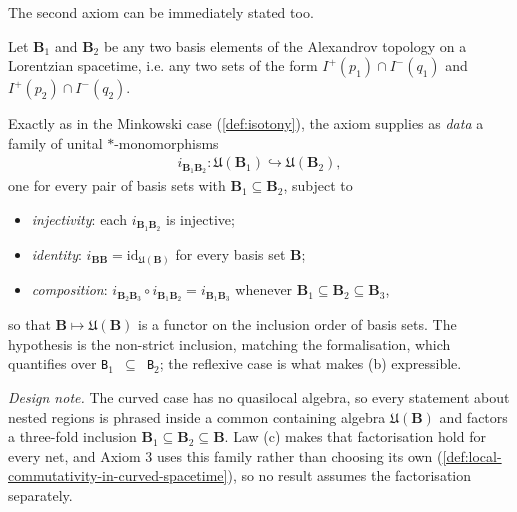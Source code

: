 The second axiom can be immediately stated too.

\begin{definition}
    \label{def:isotony-in-curved-spacetime}
    \leanok
    Let $\mathbf{B}_1$ and $\mathbf{B}_2$ be any two basis elements of the Alexandrov topology on a Lorentzian spacetime, i.e. any two sets of the form $I^+(p_1) \cap I^-(q_1)$ and $I^+(p_2) \cap I^-(q_2)$.
    
    Exactly as in the Minkowski case (\ref{def:isotony}), the axiom supplies as \emph{data} a family of unital $*$-monomorphisms
    \begin{align}
        i_{\mathbf{B}_1\mathbf{B}_2} : \mathfrak{U}(\mathbf{B}_1) \hookrightarrow \mathfrak{U}(\mathbf{B}_2),
    \end{align}
    one for every pair of basis sets with $\mathbf{B}_1 \subseteq \mathbf{B}_2$, subject to
    \begin{itemize}
        \item[(a)] \emph{injectivity}: each $i_{\mathbf{B}_1\mathbf{B}_2}$ is injective;
        \item[(b)] \emph{identity}: $i_{\mathbf{B}\mathbf{B}} = \mathrm{id}_{\mathfrak{U}(\mathbf{B})}$ for every basis set $\mathbf{B}$;
        \item[(c)] \emph{composition}: $i_{\mathbf{B}_2\mathbf{B}_3} \circ i_{\mathbf{B}_1\mathbf{B}_2} = i_{\mathbf{B}_1\mathbf{B}_3}$ whenever $\mathbf{B}_1 \subseteq \mathbf{B}_2 \subseteq \mathbf{B}_3$,
    \end{itemize}
    so that $\mathbf{B} \mapsto \mathfrak{U}(\mathbf{B})$ is a functor on the inclusion order of basis sets. The hypothesis is the non-strict inclusion, matching the formalisation, which quantifies over \texttt{B\ensuremath{_1} \ensuremath{\subseteq} B\ensuremath{_2}}; the reflexive case is what makes (b) expressible.

    \emph{Design note.} The curved case has no quasilocal algebra, so every statement about nested regions is phrased inside a common containing algebra $\mathfrak{U}(\mathbf{B})$ and factors a three-fold inclusion $\mathbf{B}_1 \subseteq \mathbf{B}_2 \subseteq \mathbf{B}$. Law (c) makes that factorisation hold for every net, and Axiom 3 uses this family rather than choosing its own (\ref{def:local-commutativity-in-curved-spacetime}), so no result assumes the factorisation separately.
\end{definition}

